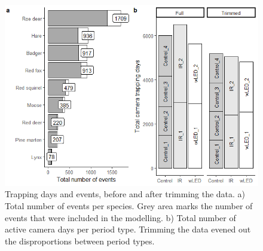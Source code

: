 \begin{figure}
	\centering
	\includegraphics[width=\textwidth]{../R/glmm_sp_files/figure-html/days-count-2.png} 
		\caption[Camera trapping days and number of events]%
	{Trapping days and events, before and after trimming the data. a) Total number of events per species. Grey area marks the number of events that were included in the modelling. b) Total number of active camera days per period type. Trimming the data evened out the disproportions between period types.}\label{fig:events}
\end{figure}


